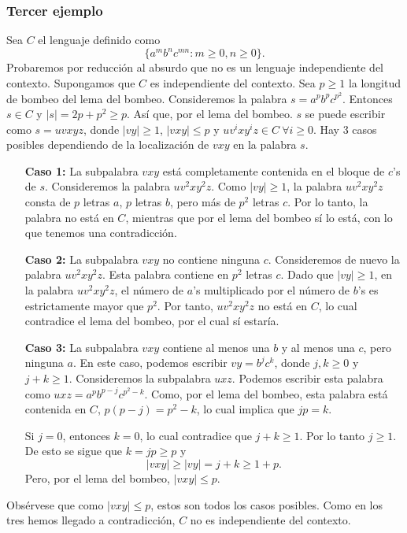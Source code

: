 \documentclass[twoside]{article}
\begin{document}
\subsubsection{Tercer ejemplo}
Sea $C$ el lenguaje definido como 
$$\{a^mb^nc^{mn}:m\geq 0, n\geq 0\}.$$
Probaremos por reducción al absurdo que no es un lenguaje independiente del contexto. Supongamos que $C$ es independiente del contexto. Sea $p\geq 1$ la longitud de bombeo del lema del bombeo. Consideremos la palabra $s=a^pb^pc^{p^2}$. Entonces $s\in C$ y $|s|=2p+p^2\geq p$. Así que, por el lema del bombeo. $s$ se puede escribir como $s=uvxyz$, donde $|vy|\geq 1$, $|vxy|\leq p$ y $uv^ixy^iz\in C\ \forall i\geq 0$. Hay 3 casos posibles dependiendo de la localización de $vxy$ en la palabra $s$.
\begin{itemize}
\item[\textbf{Caso 1:}] La subpalabra $vxy$ está completamente contenida en el bloque de $c$'s de $s$. Consideremos la palabra $uv^2xy^2z$. Como $|vy|\geq 1$, la palabra $uv^2xy^2z$ consta de $p$ letras $a$, $p$ letras $b$, pero más de $p^2$ letras $c$. Por lo tanto, la palabra no está en $C$, mientras que por el lema del bombeo sí lo está, con lo que tenemos una contradicción.

\item[\textbf{Caso 2:}] La subpalabra $vxy$ no contiene ninguna $c$. Consideremos de nuevo la palabra $uv^2xy^2z$. Esta palabra contiene en $p^2$ letras $c$. Dado que $|vy|\geq 1$, en la palabra $uv^2xy^2z$, el número de $a$'s multiplicado por el número de $b$'s es estrictamente mayor que $p^2$. Por tanto,  $uv^2xy^2z$ no está en $C$, lo cual contradice el lema del bombeo, por el cual sí estaría.

\item[\textbf{Caso 3:}] La subpalabra $vxy$ contiene al menos una $b$ y al menos una $c$, pero ninguna $a$. En este caso, podemos escribir $vy=b^jc^k$, donde $j,k\geq 0$ y $j+k\geq 1$. Consideremos la subpalabra $uxz$. Podemos escribir esta palabra como $uxz=a^pb^{p-j}c^{p^2-k}$. Como, por el lema del bombeo, esta palabra está contenida en $C$, $p(p-j)=p^2-k$, lo cual implica que $jp=k$. 

Si $j=0$, entonces $k=0$, lo cual contradice que $j+k\geq 1$. Por lo tanto $j\geq 1$. De esto se sigue que $k=jp\geq p$ y 
$$|vxy|\geq |vy|=j+k\geq 1+p.$$
Pero, por el lema del bombeo, $|vxy|\leq p$. 
\end{itemize}
Obsérvese que como $|vxy|\leq p$, estos son todos los casos posibles. Como en los tres hemos llegado a contradicción, $C$ no es independiente del contexto. 
\end{document}
